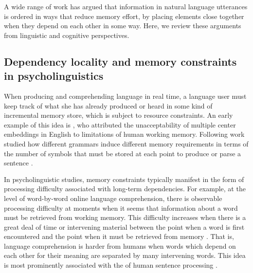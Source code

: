 A wide range of work has argued that information in natural language utterances is ordered in ways that reduce memory effort, by placing elements close together when they depend on each other in some way. Here, we review these arguments from linguistic and cognitive perspectives.

\subsection{Dependency locality and memory constraints in psycholinguistics}

When producing and comprehending language in real time, a language user must keep track of what she has already produced or heard in some kind of incremental memory store, which is subject to resource constraints.
An early example of this idea is \citet{miller-finitary-1963}, who attributed the unacceptability of multiple center embeddings in English to limitations of human working memory. Following work studied how different grammars induce different memory requirements in terms of the number of symbols that must be stored at each point to produce or parse a sentence \citet{yngve1960model,yngve1961depth,abney1991memory,gibson1991computational,resnik1992left}.

In psycholinguistic studies, memory constraints typically manifest in the form of processing difficulty associated with long-term dependencies.
For example, at the level of word-by-word online language comprehension, there is observable processing difficulty at moments when it seems that information about a word must be retrieved from working memory. 
This difficulty increases when there is a great deal of time or intervening material between the point when a word is first encountered and the point when it must be retrieved from memory  \citep{gibson1998syntactic,gibson1999memory,gibson2000dependency,mcelree,lewis2005activationbased,bartek2011search,nicenboim2015working}. 
That is, language comprehension is harder from humans when words which depend on each other for their meaning are separated by many intervening words.
This idea is most prominently associated with the  of human sentence processing \citep{gibson2000dependency}.

